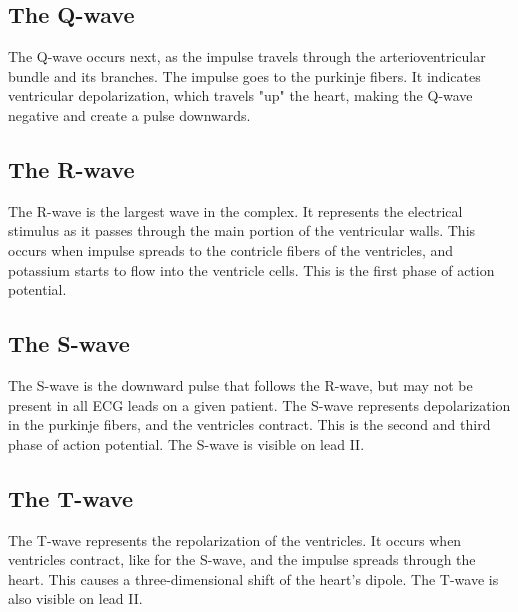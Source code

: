 \documentclass[11pt]{book}
\begin{document}
\subsection{The Q-wave}
The Q-wave occurs next, as the impulse travels through the arterioventricular bundle and its branches. The impulse goes to the purkinje fibers. It indicates ventricular depolarization, which travels "up" the heart, making the Q-wave negative and create a pulse downwards.

\subsection{The R-wave}
The R-wave is the largest wave in the complex. It represents the electrical stimulus as it passes through the main portion of the ventricular walls. This occurs when impulse spreads to the contricle fibers of the ventricles, and potassium starts to flow into the ventricle cells. This is the first phase of action potential.

\subsection{The S-wave}
The S-wave is the downward pulse that follows the R-wave, but may not be present in all ECG leads on a given patient. The S-wave represents depolarization in the purkinje fibers, and the ventricles contract. This is the second and third phase of action potential. The S-wave is visible on lead II.

\subsection{The T-wave}
The T-wave represents the repolarization of the ventricles. It occurs when ventricles contract, like for the S-wave, and the impulse spreads through the heart. This causes a three-dimensional shift of the heart's dipole. The T-wave is also visible on lead II.
\end{document}
